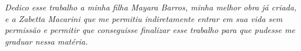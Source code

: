 \begin{dedicatoria}
   \vspace*{\fill}
   \centering
   \noindent
   \textit{Dedico esse trabalho a minha filha Mayara Barros, minha melhor obra já criada, e a Zabetta Macarini que me permitiu indiretamente entrar em sua vida sem permissão e permitir que conseguisse finalizar esse trabalho para que pudesse me graduar nessa matéria.} \vspace*{\fill}
\end{dedicatoria}
